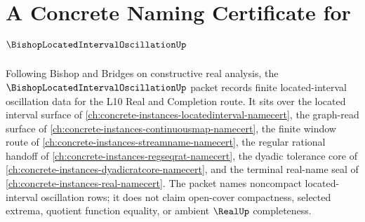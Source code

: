 \chapter{A Concrete Naming Certificate for $\BishopLocatedIntervalOscillationUp$}
\label{ch:concrete-instances-bishop-located-interval-oscillation-namecert}

Following Bishop and Bridges on constructive real analysis, the $\BishopLocatedIntervalOscillationUp$ packet records finite located-interval oscillation data for the L10 Real and Completion route. It sits over the located interval surface of \autoref{ch:concrete-instances-locatedinterval-namecert}, the graph-read surface of \autoref{ch:concrete-instances-continuousmap-namecert}, the finite window route of \autoref{ch:concrete-instances-streamname-namecert}, the regular rational handoff of \autoref{ch:concrete-instances-regseqrat-namecert}, the dyadic tolerance core of \autoref{ch:concrete-instances-dyadicratcore-namecert}, and the terminal real-name seal of \autoref{ch:concrete-instances-real-namecert}. The packet names noncompact located-interval oscillation rows; it does not claim open-cover compactness, selected extrema, quotient function equality, or ambient $\RealUp$ completeness.

